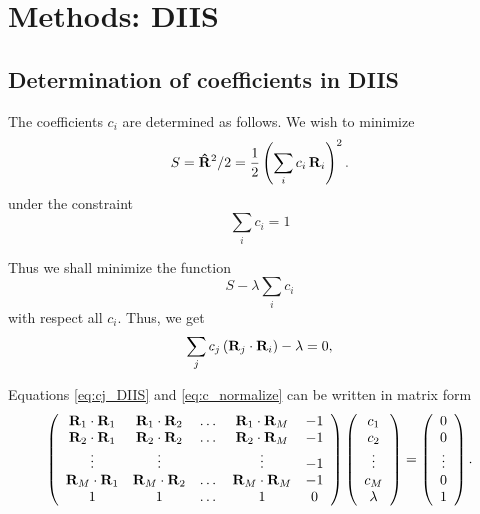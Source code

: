 \documentclass[aip,jcp,preprint,notitlepage, superscriptaddress]{revtex4-1}
\begin{document}
\section{Methods: DIIS}


\subsection{Determination of coefficients in DIIS}



The coefficients $c_i$ are determined as follows.
%
We wish to minimize
%
\[
S
=
\mathbf{\hat R}^2 / 2
=
\frac 1 2 \left( \sum_i c_i \, \mathbf{R}_i \right)^2.
\]
under the constraint
%
\begin{equation}
\sum_i c_i = 1
\label{eq:c_normalize}
\end{equation}



Thus we shall minimize the function
\[
  S - \lambda \sum_i c_i
\]
with respect all $c_i$.
%
Thus, we get
\begin{equation}
  \sum_j c_j \, (\mathbf{R}_j \cdot \mathbf{R}_i) - \lambda = 0,
  \label{eq:cj_DIIS}
\end{equation}


Equations \eqref{eq:cj_DIIS} and \eqref{eq:c_normalize}
can be written in matrix form
%
\begin{equation}
\left(
  \begin{array}{ccccc}
    \mathbf{R}_1 \cdot \mathbf{R}_1 &
    \mathbf{R}_1 \cdot \mathbf{R}_2 &
    \dots &
    \mathbf{R}_1 \cdot \mathbf{R}_M &
    -1 \\
    \mathbf{R}_2 \cdot \mathbf{R}_1 &
    \mathbf{R}_2 \cdot \mathbf{R}_2 &
    \dots &
    \mathbf{R}_2 \cdot \mathbf{R}_M &
    -1 \\
    \vdots &
    \vdots &
    &
    \vdots &
    -1 \\
    \mathbf{R}_M \cdot \mathbf{R}_1 &
    \mathbf{R}_M \cdot \mathbf{R}_2 &
    \dots &
    \mathbf{R}_M \cdot \mathbf{R}_M &
    -1 \\
    1 &
    1 &
    \dots &
    1 &
    0
  \end{array}
\right)
\left(
  \begin{array}{c}
    c_1 \\
    c_2 \\
    \vdots \\
    c_M \\
    \lambda
  \end{array}
\right)
=
\left(
  \begin{array}{c}
    0 \\
    0 \\
    \vdots \\
    0 \\
    1
  \end{array}
\right).
\end{equation}
\end{document}
